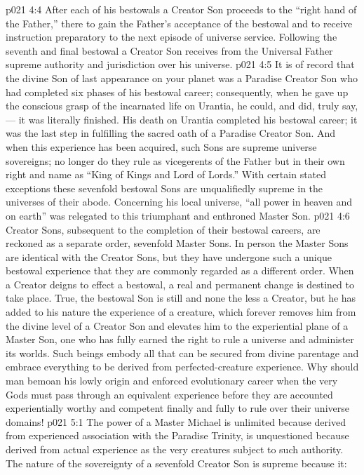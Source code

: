 \vs p021 4:4 After each of his bestowals a Creator Son proceeds to the “right hand of the Father,” there to gain the Father’s acceptance of the bestowal and to receive instruction preparatory to the next episode of universe service. Following the seventh and final bestowal a Creator Son receives from the Universal Father supreme authority and jurisdiction over his universe.
\vs p021 4:5 \pc It is of record that the divine Son of last appearance on your planet was a Paradise Creator Son who had completed six phases of his bestowal career; consequently, when he gave up the conscious grasp of the incarnated life on Urantia, he could, and did, truly say,  --- it was literally finished. His death on Urantia completed his bestowal career; it was the last step in fulfilling the sacred oath of a Paradise Creator Son. And when this experience has been acquired, such Sons are supreme universe sovereigns; no longer do they rule as vicegerents of the Father but in their own right and name as “King of Kings and Lord of Lords.” With certain stated exceptions these sevenfold bestowal Sons are unqualifiedly supreme in the universes of their abode. Concerning his local universe, “all power in heaven and on earth” was relegated to this triumphant and enthroned Master Son.
\vs p021 4:6 \pc Creator Sons, subsequent to the completion of their bestowal careers, are reckoned as a separate order, sevenfold Master Sons. In person the Master Sons are identical with the Creator Sons, but they have undergone such a unique bestowal experience that they are commonly regarded as a different order. When a Creator deigns to effect a bestowal, a real and permanent change is destined to take place. True, the bestowal Son is still and none the less a Creator, but he has added to his nature the experience of a creature, which forever removes him from the divine level of a Creator Son and elevates him to the experiential plane of a Master Son, one who has fully earned the right to rule a universe and administer its worlds. Such beings embody all that can be secured from divine parentage and embrace everything to be derived from perfected\hyp{}creature experience. Why should man bemoan his lowly origin and enforced evolutionary career when the very Gods must pass through an equivalent experience before they are accounted experientially worthy and competent finally and fully to rule over their universe domains!
\vs p021 5:1 The power of a Master Michael is unlimited because derived from experienced association with the Paradise Trinity, is unquestioned because derived from actual experience as the very creatures subject to such authority. The nature of the sovereignty of a sevenfold Creator Son is supreme because it:
